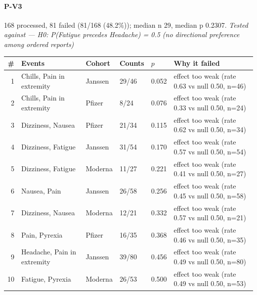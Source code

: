 \documentclass[11pt]{article}
\begin{document}
\paragraph{P-V3} 168 processed, 81 failed (81/168 (48.2\%)); median n 29, median p 0.2307. \emph{Tested against --- H0: P(Fatigue precedes Headache) = 0.5 (no directional preference among ordered reports)} \\
\begin{longtable}{@{}r p{3.9cm} p{2.5cm} l l p{4.4cm}@{}}
\toprule
\# & Events & Cohort & Counts & $p$ & Why it failed \\
\midrule \endhead
1 & Chills, Pain in extremity & Janssen & 29/46 & 0.052 & effect too weak (rate 0.63 vs null 0.50, n=46) \\
2 & Chills, Pain in extremity & Pfizer & 8/24 & 0.076 & effect too weak (rate 0.33 vs null 0.50, n=24) \\
3 & Dizziness, Nausea & Pfizer & 21/34 & 0.115 & effect too weak (rate 0.62 vs null 0.50, n=34) \\
4 & Dizziness, Fatigue & Janssen & 31/54 & 0.170 & effect too weak (rate 0.57 vs null 0.50, n=54) \\
5 & Dizziness, Fatigue & Moderna & 11/27 & 0.221 & effect too weak (rate 0.41 vs null 0.50, n=27) \\
6 & Nausea, Pain & Janssen & 26/58 & 0.256 & effect too weak (rate 0.45 vs null 0.50, n=58) \\
7 & Dizziness, Nausea & Moderna & 12/21 & 0.332 & effect too weak (rate 0.57 vs null 0.50, n=21) \\
8 & Pain, Pyrexia & Pfizer & 16/35 & 0.368 & effect too weak (rate 0.46 vs null 0.50, n=35) \\
9 & Headache, Pain in extremity & Janssen & 39/80 & 0.456 & effect too weak (rate 0.49 vs null 0.50, n=80) \\
10 & Fatigue, Pyrexia & Moderna & 26/53 & 0.500 & effect too weak (rate 0.49 vs null 0.50, n=53) \\
\bottomrule
\end{longtable}
\end{document}
